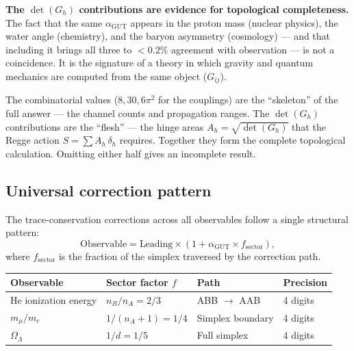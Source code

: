 \textbf{The $\det(G_h)$ contributions are evidence for topological completeness.} The fact that the same $\alpha_\text{GUT}$ appears in the proton mass (nuclear physics), the water angle (chemistry), and the baryon asymmetry (cosmology) --- and that including it brings all three to $< 0.2\%$ agreement with observation --- is not a coincidence. It is the signature of a theory in which gravity and quantum mechanics are computed from the same object ($G_{ij}$).

\begin{remark}
The combinatorial values ($8, 30, 6\pi^2$ for the couplings) are the ``skeleton'' of the full answer --- the channel counts and propagation ranges. The $\det(G_h)$ contributions are the ``flesh'' --- the hinge areas $A_h = \sqrt{\det(G_h)}$ that the Regge action $S = \sum A_h\,\delta_h$ requires. Together they form the complete topological calculation. Omitting either half gives an incomplete result.
\end{remark}

\subsection{Universal correction pattern}
\label{sec:universal_correction}

The trace-conservation corrections across all observables follow a single structural pattern:
\begin{equation}
\boxed{\text{Observable} = \text{Leading} \times \left(1 + \alpha_\mathrm{GUT} \times f_\mathrm{sector}\right),}
\end{equation}
where $f_\mathrm{sector}$ is the fraction of the simplex traversed by the correction path.

\begin{center}
\begin{tabular}{llll}
\toprule
Observable & Sector factor $f$ & Path & Precision \\
\midrule
He ionization energy & $n_B/n_A = 2/3$ & ABB $\to$ AAB & 4 digits \\
$m_\mu/m_e$ & $1/(n_A+1) = 1/4$ & Simplex boundary & 4 digits \\
$\Omega_\Lambda$ & $1/d = 1/5$ & Full simplex & 4 digits \\
\bottomrule
\end{tabular}
\end{center}

